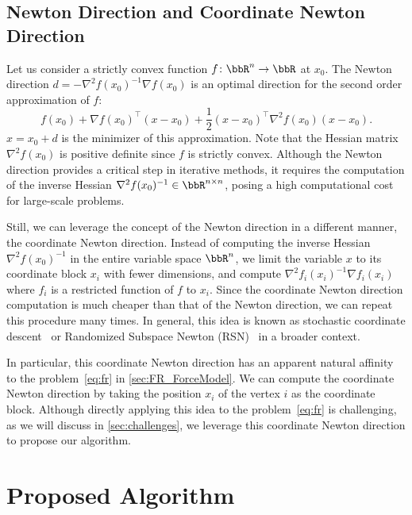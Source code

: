 \documentclass[dvipdfmx,10pt,journal,compsoc]{IEEEtran}
\begin{document}
\subsection{Newton Direction and Coordinate Newton Direction}\label{ssec:introNewton}

Let us consider a strictly convex function $f\colon \bbR^n \to \bbR$ at $x_0$.
The Newton direction $d = -\nabla^2 f(x_0)^{-1} \nabla f(x_0)$ is an optimal direction for the second order approximation of $f$:
\begin{equation*}
  f(x_0) + \nabla f(x_0)^\top (x - x_0) + \frac{1}{2} (x - x_0)^\top \nabla^2 f(x_0) (x - x_0).
\end{equation*}
$x = x_0 + d$ is the minimizer of this approximation.
Note that the Hessian matrix $\nabla^2 f(x_0)$ is positive definite since $f$ is strictly convex.
Although the Newton direction provides a critical step in iterative methods, it requires the computation of the inverse Hessian $\nabla^2 f(x_0)^{-1} \in \bbR^{n \times n}$, posing a high computational cost for large-scale problems.

Still, we can leverage the concept of the Newton direction in a different manner, the coordinate Newton direction.
Instead of computing the inverse Hessian $\nabla^2 f(x_0)^{-1}$ in the entire variable space $\bbR^n$, we limit the variable $x$ to its coordinate block $x_i$ with fewer dimensions, and compute $\nabla^2 f_i(x_i)^{-1} \nabla f_i(x_i)$ where $f_i$ is a restricted function of $f$ to $x_i$.
Since the coordinate Newton direction computation is much cheaper than that of the Newton direction, we can repeat this procedure many times.
In general, this idea is known as stochastic coordinate descent~\cite{recht-wright} or Randomized Subspace Newton (RSN)~\cite{NEURIPS2019_bc6dc48b} in a broader context.

In particular, this coordinate Newton direction has an apparent natural affinity to the problem~\eqref{eq:fr} in \cref{sec:FR_ForceModel}.
We can compute the coordinate Newton direction by taking the position $x_i$ of the vertex $i$ as the coordinate block.
Although directly applying this idea to the problem~\eqref{eq:fr} is challenging, as we will discuss in \cref{sec:challenges}, we leverage this coordinate Newton direction to propose our algorithm.

\section{Proposed Algorithm}\label{sec:algorithm}
\end{document}
